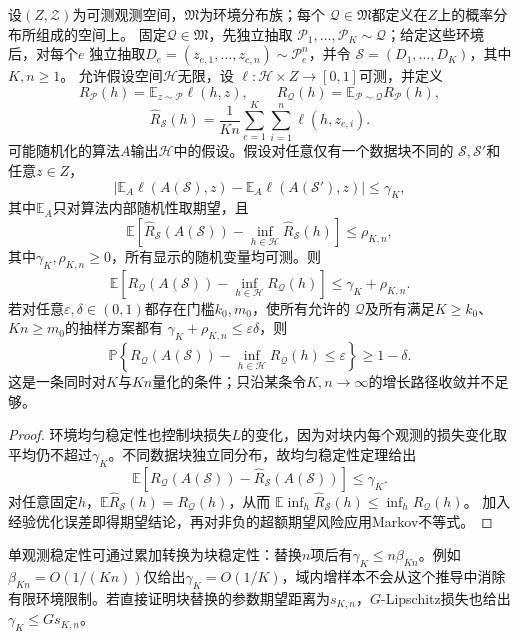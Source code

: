 \begin{theorem}[环境稳定性与平均可学习性]
\label{thm:dg-environment-stability}
设$(Z,\mathcal Z)$为可测观测空间，$\mathfrak M$为环境分布族；每个
$\mathcal Q\in\mathfrak M$都定义在$Z$上的概率分布所组成的空间上。
固定$\mathcal Q\in\mathfrak M$，先独立抽取
$\mathcal P_1,\ldots,\mathcal P_K\sim\mathcal Q$；给定这些环境后，对每个$e$
独立抽取$D_e=(z_{e,1},\ldots,z_{e,n})\sim\mathcal P_e^n$，并令
$\mathcal S=(D_1,\ldots,D_K)$，其中$K,n\geq1$。
允许假设空间$\mathcal H$无限，设
$\ell:\mathcal H\times Z\to[0,1]$可测，并定义
\[
 R_{\mathcal P}(h)=\mathbb E_{z\sim\mathcal P}\ell(h,z),\qquad
 R_{\mathcal Q}(h)=\mathbb E_{\mathcal P\sim\mathcal Q}R_{\mathcal P}(h),
\]
\[
 \widehat R_{\mathcal S}(h)=\frac1{Kn}
 \sum_{e=1}^K\sum_{i=1}^n\ell(h,z_{e,i}).
\]
可能随机化的算法$A$输出$\mathcal H$中的假设。假设对任意仅有一个数据块不同的
$\mathcal S,\mathcal S'$和任意$z\in Z$，
\[
 \left|\mathbb E_A\ell(A(\mathcal S),z)
 -\mathbb E_A\ell(A(\mathcal S'),z)\right|\leq\gamma_K,
\]
其中$\mathbb E_A$只对算法内部随机性取期望，且
\[
 \mathbb E\!\left[\widehat R_{\mathcal S}(A(\mathcal S))-
                  \inf_{h\in\mathcal H}\widehat R_{\mathcal S}(h)\right]\leq\rho_{K,n},
\]
其中$\gamma_K,\rho_{K,n}\geq0$，所有显示的随机变量均可测。则
\[
 \mathbb E\!\left[R_{\mathcal Q}(A(\mathcal S))-
                  \inf_{h\in\mathcal H}R_{\mathcal Q}(h)\right]
 \leq\gamma_K+\rho_{K,n}.
\]
若对任意$\varepsilon,\delta\in(0,1)$都存在门槛$k_0,m_0$，使所有允许的
$\mathcal Q$及所有满足$K\geq k_0$、$Kn\geq m_0$的抽样方案都有
$\gamma_K+\rho_{K,n}\leq\varepsilon\delta$，则
\[
 \mathbb P\left\{
 R_{\mathcal Q}(A(\mathcal S))
 -\inf_{h\in\mathcal H}R_{\mathcal Q}(h)
 \leq\varepsilon\right\}\geq1-\delta.
\]
这是一条同时对$K$与$Kn$量化的条件；只沿某条令$K,n\to\infty$的增长路径收敛并不足够。
\end{theorem}
\begin{proof}
环境均匀稳定性也控制块损失$L$的变化，因为对块内每个观测的损失变化取平均仍不超过$\gamma_K$。不同数据块独立同分布，故均匀稳定性定理给出
\[
 \mathbb E[R_{\mathcal Q}(A(\mathcal S))-\widehat R_{\mathcal S}(A(\mathcal S))]\leq\gamma_K.
\]
对任意固定$h$，$\mathbb E\widehat R_{\mathcal S}(h)=R_{\mathcal Q}(h)$，从而
$\mathbb E\inf_h\widehat R_{\mathcal S}(h)\leq\inf_hR_{\mathcal Q}(h)$。
加入经验优化误差即得期望结论，再对非负的超额期望风险应用Markov不等式。
\end{proof}

单观测稳定性可通过累加转换为块稳定性：替换$n$项后有$\gamma_K\leq n\beta_{Kn}$。例如$\beta_{Kn}=O(1/(Kn))$仅给出$\gamma_K=O(1/K)$，域内增样本不会从这个推导中消除有限环境限制。若直接证明块替换的参数期望距离为$s_{K,n}$，$G$-Lipschitz损失也给出$\gamma_K\leq Gs_{K,n}$。


